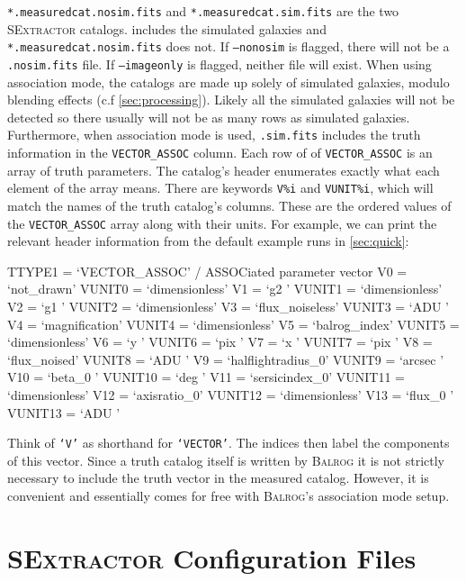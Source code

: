 \documentclass[11pt]{book}
\newcommand{\codett}[1]{\texttt{#1}}
\newcommand{\balrog}{\textsc{Balrog}}
\newcommand{\sex}{\textsc{SExtractor}}
\newcommand{\opt}[1]{\codett{--#1}}
\begin{document}
\codett{*.measuredcat.nosim.fits} and \codett{*.measuredcat.sim.fits} are the two \sex{} catalogs.
 includes the simulated galaxies and \codett{*.measuredcat.nosim.fits} does not.
If \opt{nonosim} is flagged, there will not be a \codett{.nosim.fits} file.
If \opt{imageonly} is flagged, neither file will exist.
When using association mode, the catalogs are made up solely of simulated galaxies, 
modulo blending effects (c.f \autoref{sec:processing}). Likely all the simulated galaxies will not
be detected so there usually will not be as many rows as simulated galaxies.
Furthermore, when  association mode is used, \codett{.sim.fits} includes the truth information
in the \codett{VECTOR\_ASSOC} column. Each row of of \codett{VECTOR\_ASSOC} is an array of truth parameters.
The catalog's header enumerates exactly what each element of the array means.
There are keywords \codett{V\%i} and \codett{VUNIT\%i}, which will match the names of the truth catalog's columns.
These are the ordered values of the \codett{VECTOR\_ASSOC} array along with their units.
For example, we can print the relevant header information from the default example runs in \autoref{sec:quick}:
\begin{cmdline}
TTYPE1  = `VECTOR_ASSOC'       / ASSOCiated parameter vector
V0      = `not_drawn'
VUNIT0  = `dimensionless'
V1      = `g2      '
VUNIT1  = `dimensionless'
V2      = `g1      '
VUNIT2  = `dimensionless'
V3      = `flux_noiseless'
VUNIT3  = `ADU     '
V4      = `magnification'
VUNIT4  = `dimensionless'
V5      = `balrog_index'
VUNIT5  = `dimensionless'
V6      = `y       '
VUNIT6  = `pix     '
V7      = `x       '
VUNIT7  = `pix     '
V8      = `flux_noised'
VUNIT8  = `ADU     '
V9      = `halflightradius_0'
VUNIT9  = `arcsec  '
V10     = `beta_0  '
VUNIT10 = `deg     '
V11     = `sersicindex_0'
VUNIT11 = `dimensionless'
V12     = `axisratio_0'
VUNIT12 = `dimensionless'
V13     = `flux_0  '
VUNIT13 = `ADU     '
\end{cmdline}
Think of \codett{`V'} as shorthand for \codett{`VECTOR'}. The indices then label the components of this vector.
Since a truth catalog itself is written by \balrog{} it is not strictly necessary to include the truth
vector in the measured catalog. However, it is convenient and essentially comes for free with \balrog{}'s
association mode setup. 


\section{\sex{} Configuration Files}
\label{sec:sexfiles}
\end{document}
